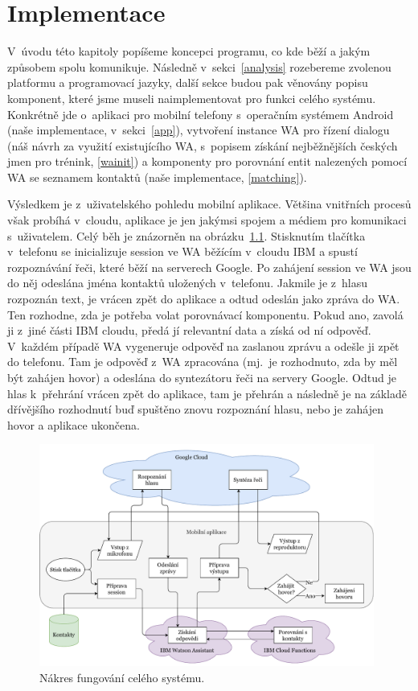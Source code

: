 \chapter{Implementace}\label{chapter-implementation}

V~úvodu této kapitoly popíšeme koncepci programu, co kde
běží a jakým způsobem spolu komunikuje. Následně v~sekci~\ref{analysis}
rozebereme zvolenou platformu a programovací jazyky,
další sekce budou pak věnovány popisu komponent, které jsme museli
naimplementovat pro funkci celého systému. Konkrétně jde o~aplikaci pro
mobilní telefony s~operačním systémem Android (naše implementace,
v~sekci~\ref{app}), vytvoření instance WA pro řízení
dialogu (náš návrh za využití existujícího WA,
s~popisem získání nejběžnějších českých jmen pro trénink, \ref{wainit}) a komponenty
pro porovnání entit nalezených pomocí WA se seznamem kontaktů (naše implementace,
\ref{matching}).

Výsledkem je z~uživatelského pohledu mobilní
aplikace. Většina vnitřních procesů však probíhá v~cloudu, aplikace
je jen jakýmsi spojem a médiem pro komunikaci s~uživatelem. Celý běh
je znázorněn na obrázku~\ref{img-flowchart}. Stisknutím tlačítka
v~telefonu se
inicializuje session ve WA běžícím v~cloudu IBM a spustí rozpoznávání řeči,
které běží na serverech Google. Po zahájení session ve WA jsou do něj
odeslána jména kontaktů uložených v~telefonu. Jakmile je z~hlasu rozpoznán
text, je vrácen zpět do aplikace a odtud odeslán jako zpráva do WA.
Ten rozhodne, zda je potřeba volat
porovnávací komponentu. Pokud ano, zavolá ji z~jiné části IBM cloudu,
předá jí relevantní data a získá od ní odpověď. V~každém případě
WA vygeneruje odpověď na zaslanou zprávu a odešle ji zpět do telefonu.
Tam je odpověď z~WA zpracována (mj.\ je rozhodnuto, zda by měl být
zahájen hovor) a odeslána do syntezátoru řeči na servery Google.
Odtud je hlas k~přehrání vrácen zpět do aplikace, tam je přehrán
a následně je na základě dřívějšího rozhodnutí buď spuštěno znovu
rozpoznání hlasu, nebo je zahájen hovor a aplikace ukončena.

\begin{figure}[h]
    \centering
    \includegraphics[width=0.98\textwidth]{../img/app-flowchart.pdf}
    \caption{Nákres fungování celého systému.}\label{img-flowchart}
\end{figure}

